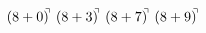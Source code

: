 \documentclass[preview]{standalone}
\begin{document}
\begin{align*}
(8+0)^{\hspace{-0.1cm}\urcorner} \ (8+3)^{\hspace{-0.1cm}\urcorner} \ (8+7)^{\hspace{-0.1cm}\urcorner} \ (8+9)^{\hspace{-0.1cm}\urcorner}
\end{align*}
\end{document}
